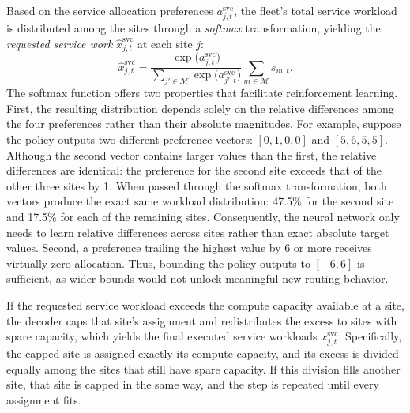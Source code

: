 \documentclass{UNCC-thesis}
\begin{document}
Based on the service allocation preferences \(a^{\mathrm{svc}}_{j,t}\), the fleet's total
service workload is distributed among the sites through a \emph{softmax} transformation,
yielding the \emph{requested service work} \(\hat x^{\mathrm{svc}}_{j,t}\) at each site
\(j\):
\begin{equation}
  \hat x^{\mathrm{svc}}_{j,t}
  =
  \frac{\exp\bigl(a^{\mathrm{svc}}_{j,t}\bigr)}
       {\sum_{j'\in\mathcal M}\exp\bigl(a^{\mathrm{svc}}_{j',t}\bigr)}
  \sum_{m\in\mathcal M}s_{m,t}.
  \label{eq:service-request}
\end{equation}
The softmax function offers two properties that facilitate reinforcement learning. First,
the resulting distribution depends solely on the relative differences among the four
preferences rather than their absolute magnitudes. For example, suppose the policy outputs
two different preference vectors: \([0,1,0,0]\) and \([5,6,5,5]\). Although the second vector
contains larger values than the first, the relative differences are identical: the preference
for the second site exceeds that of the other three sites by 1. When passed through the softmax
transformation, both vectors produce the exact same workload distribution: 47.5\% for the second
site and 17.5\% for each of the remaining sites.
Consequently, the neural network only needs to learn relative differences across sites rather than exact absolute target values. Second, a
preference trailing the highest value by 6 or more receives virtually zero allocation. Thus,
bounding the policy outputs to \([-6,6]\) is sufficient, as wider bounds would not unlock
meaningful new routing behavior.

If the requested service workload exceeds the compute capacity available at a site, the
decoder caps that site's assignment and redistributes the excess to sites with spare
capacity, which yields the final executed service workloads \(x^{\mathrm{svc}}_{j,t}\).
Specifically, the capped site is assigned exactly its compute capacity, and its excess is divided
equally among the sites that still have spare capacity. If this division fills another site,
that site is capped in the same way, and the step is repeated until every assignment fits.
\end{document}
